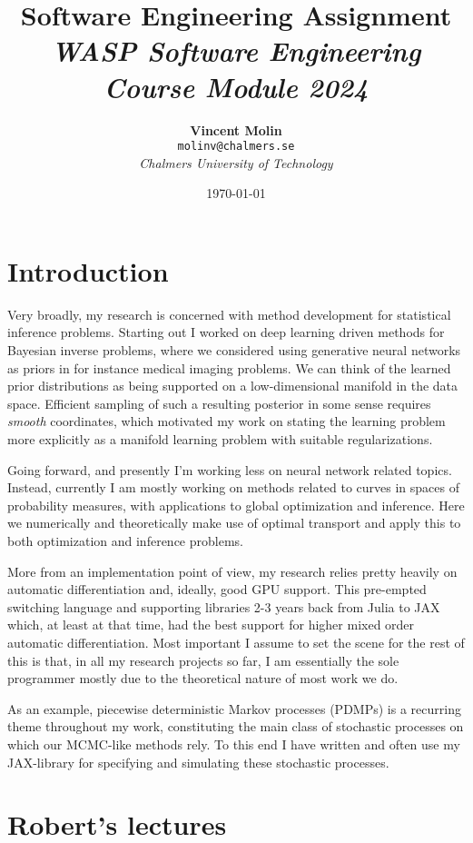 \documentclass[11pt]{diazessay}
\title{\textbf{Software Engineering Assignment} \\ {\large\itshape WASP Software Engineering Course Module 2024}}
\author{\textbf{Vincent Molin} \\ \small \texttt{molinv@chalmers.se}\\ \textit{Chalmers University of Technology}}
\date{\today}
\begin{document}
\maketitle

\section*{Introduction}

Very broadly, my research is concerned with method development for statistical inference problems. Starting out I worked on deep learning driven methods for Bayesian inverse problems, where we considered using generative neural networks as priors in for instance medical imaging problems. We can think of the learned prior distributions as being supported on a low-dimensional manifold in the data space. Efficient sampling of such a resulting posterior in some sense requires \textit{smooth} coordinates, which motivated my work on stating the learning problem more explicitly as a manifold learning problem with suitable regularizations. 

Going forward, and presently I'm working less on neural network related topics. Instead, currently I am mostly working on methods related to curves in spaces of probability measures, with applications to global optimization and inference. Here we numerically and theoretically make use of optimal transport and apply this to both optimization and inference problems. 

More from an implementation point of view, my research relies pretty heavily on automatic differentiation and, ideally, good GPU support. This pre-empted switching language and supporting libraries 2-3 years back from Julia to JAX which, at least at that time, had the best support for higher mixed order automatic differentiation. Most important I assume to set the scene for the rest of this is that, in all my research projects so far, I am essentially the sole programmer mostly due to the theoretical nature of most work we do. 

As an example, piecewise deterministic Markov processes (PDMPs) is a recurring theme throughout my work, constituting the main class of stochastic processes on which our MCMC-like methods rely. To this end I have written and often use my JAX-library for specifying and simulating these stochastic processes.

\section*{Robert's lectures}
\end{document}
